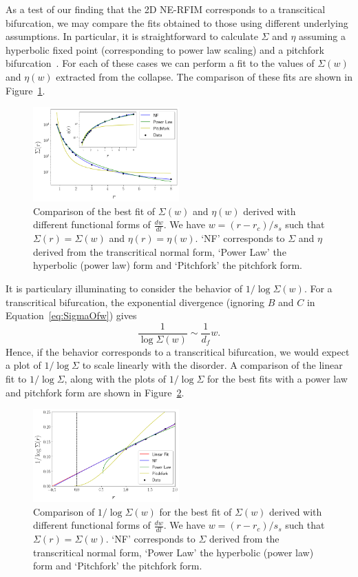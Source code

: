 \documentclass[reprint,amsmath,amssymb,aps,floatfix, prl]{revtex4-1}
\begin{document}
%
As a test of our finding that the 2D NE-RFIM corresponds to a transcitical bifurcation, we may compare the fits obtained to those using different underlying assumptions. In particular, it is straightforward to calculate $\Sigma$ and $\eta$ assuming a hyperbolic fixed point (corresponding to power law scaling) and a pitchfork bifurcation~\cite{RFIM2Dsupp}. For each of these cases we can perform a fit to the values of $\Sigma(w)$ and $\eta(w)$ extracted from the collapse. The comparison of these fits are shown in Figure~\ref{fig:comparison}.\par
%
\begin{figure}
		\includegraphics[width=0.5\textwidth]{comparison.png}
		\caption{ Comparison of the best fit of $\Sigma(w)$ and $\eta(w)$ derived with different functional forms of $\frac{dw}{dl}$. We have $w=(r-r_c)/s_s$ such that $\Sigma(r)=\Sigma(w)$ and $\eta(r)=\eta(w)$. `NF' corresponds to $\Sigma$ and $\eta$ derived from the transcritical normal form, `Power Law' the hyperbolic (power law) form and `Pitchfork' the pitchfork form.}
		\label{fig:comparison}
\end{figure}
%
It is particulary illuminating to consider the behavior of $1/\log\Sigma(w)$. For a transcritical bifurcation, the exponential divergence (ignoring $B$ and $C$ in Equation~\ref{eq:SigmaOfw}) gives
%
\begin{equation}
	\frac{1}{\log\Sigma(w)} \sim \frac{1}{d_f} w .
\end{equation}
%
\noindent Hence, if the behavior corresponds to a transcritical bifurcation, we would expect a plot of $1/\log\Sigma$ to scale linearly with the disorder. A comparison of the linear fit to $1/\log\Sigma$, along with the plots of $1/\log\Sigma$ for the best fits with a power law and pitchfork form are shown in Figure~\ref{fig:logplot}.
%
\begin{figure}
		\includegraphics[width=0.5\textwidth]{logplot.png}
		\caption{Comparison of $1/\log\Sigma(w)$ for the best fit of $\Sigma(w)$ derived with different functional forms of $\frac{dw}{dl}$. We have $w=(r-r_c)/s_s$ such that $\Sigma(r)=\Sigma(w)$. `NF' corresponds to $\Sigma$ derived from the transcritical normal form, `Power Law' the hyperbolic (power law) form and `Pitchfork' the pitchfork form.}
		\label{fig:logplot}
\end{figure}
\end{document}
